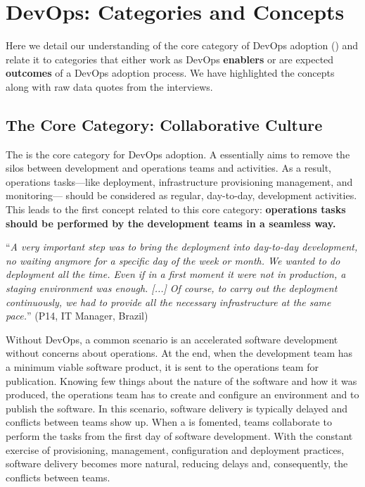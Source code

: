 \section{DevOps: Categories and Concepts} \label{sec:categories_concepts}

Here we detail our
understanding of the core category
of DevOps adoption (\cc)
and relate it to categories that either work as DevOps {\bf enablers} or
are expected {\bf outcomes} of a DevOps adoption process.
We have highlighted the concepts along with raw data quotes from the interviews.

\subsection{The Core Category: Collaborative Culture}

The \cc is the core category
for DevOps adoption. A \cc essentially aims to remove
the silos between development and operations teams and activities.
As a result, operations tasks---like deployment, infrastructure provisioning
management, and monitoring--- should be considered as regular, day-to-day,
development activities. This leads to the first concept related to
this core category: {\bf operations tasks should be performed by
the development teams in a seamless way.}

\begin{mq}
``\emph{A very important step was to bring the deployment into day-to-day
development, no waiting anymore for a specific day of the week or month. We wanted
to do deployment all the time. Even if in a first moment it were not in
production, a staging environment was enough. [...] Of course, to carry out the deployment
continuously, we had to provide all the necessary infrastructure at the same
pace.}'' (P14, IT Manager, Brazil)
\end{mq}

Without DevOps, a common scenario is an accelerated software development
without concerns about operations. At the end, when the development team has a
minimum viable software product, it is sent to the operations team for
publication. Knowing few things about the nature of the software and how it
was produced, the operations team has to create and configure an environment
and to publish the software. In this scenario, software delivery is typically
delayed and conflicts between teams show up. When a \cc is fomented, teams collaborate to perform the tasks from the first day
of software development. With the constant exercise of provisioning, management,
configuration and deployment practices, software delivery becomes more natural,
reducing delays and, consequently, the conflicts between teams.

